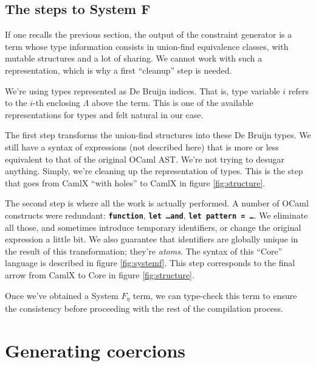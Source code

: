 \documentclass[10pt,a4paper,twoside,titlepage,twocolumn]{article}
\newcommand{\code}[1]{\textbf{\texttt{#1}}}
\begin{document}
\subsection{The steps to System F}

If one recalls the previous section, the output of the constraint generator is a
term whose type information consists in union-find equivalence classes, with
mutable structures and a lot of sharing. We cannot work with such a
representation, which is why a first ``cleanup'' step is needed.

We're using types represented as De Bruijn indices. That is, type variable
$i$ refers to the $i$-th enclosing $\Lambda$ above the term. This is one of the
available representations for types and felt natural in our case.

The first step transforms the union-find structures into these De Bruijn types.
We still have a syntax of expressions (not described here) that is more or less
equivalent to that of the original OCaml AST. We're not trying to desugar
anything. Simply, we're cleaning up the representation of types. This is the
step that goes from CamlX ``with holes'' to CamlX in figure \ref{fig:structure}.

The second step is where all the work is actually performed. A number of OCaml
constructs were redundant: \code{function}, \code{let \dots\;and}, \code{let
pattern = \dots}. We eliminate all those, and sometimes introduce temporary
identifiers, or change the original expression a little bit. We also guarantee
that identifiers are globally unique in the result of this transformation;
they're \emph{atoms}. The syntax of this ``Core'' language is described in
figure \vref{fig:systemf}. This step corresponds to the final arrow from CamlX
to Core in figure \ref{fig:structure}.

Once we've obtained a System $F_\eta$ term, we can type-check this term to
ensure the consistency before proceeding with the rest of the compilation
process.

\section{Generating coercions}

\newcommand{\forallvec}{\ensuremath{\overline{\forall}}}
\end{document}
